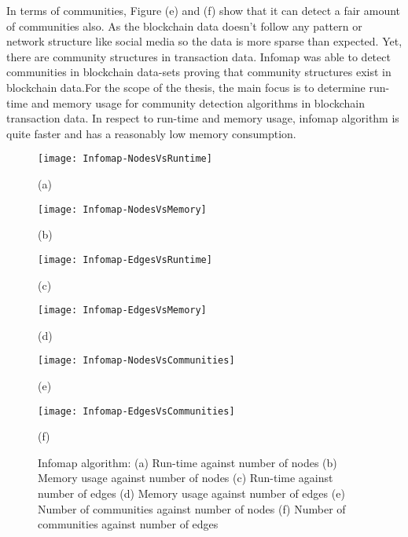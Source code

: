 In terms of communities, Figure (e) and (f) show that it can detect a fair amount of communities also. As the blockchain data doesn't follow any pattern or network structure like social media so the data is more sparse than expected. Yet, there are community structures in transaction data. Infomap was able to detect communities in blockchain data-sets proving that community structures exist in blockchain data.For the scope of the thesis, the main focus is to determine run-time and memory usage for community detection algorithms in blockchain transaction data. In respect to run-time and memory usage, infomap algorithm is quite faster and has a reasonably low memory consumption. 
\vfill

\begin{figure}[H]
  \centering
  \begin{minipage}[b]{0.4\textwidth}
    \texttt{[image: Infomap-NodesVsRuntime]}
    \caption*{(a)}
  \end{minipage}
  \begin{minipage}[b]{0.4\textwidth}
    \texttt{[image: Infomap-NodesVsMemory]}
    \caption*{(b)}
  \end{minipage}
  \begin{minipage}[b]{0.4\textwidth}
    \texttt{[image: Infomap-EdgesVsRuntime]}
    \caption*{(c)}
  \end{minipage}
  \begin{minipage}[b]{0.4\textwidth}
    \texttt{[image: Infomap-EdgesVsMemory]}
    \caption*{(d)}
  \end{minipage}
  \begin{minipage}[b]{0.4\textwidth}
    \texttt{[image: Infomap-NodesVsCommunities]}
    \caption*{(e)}
  \end{minipage}
  \begin{minipage}[b]{0.4\textwidth}
    \texttt{[image: Infomap-EdgesVsCommunities]}
    \caption*{(f)}
  \end{minipage}
  \caption{Infomap algorithm: (a) Run-time against number of nodes (b) Memory usage against number of nodes (c) Run-time against number of edges (d) Memory usage against number of edges (e) Number of communities against number of nodes (f) Number of communities against number of edges}
  \label{fig:infomap_runs}
\end{figure}


